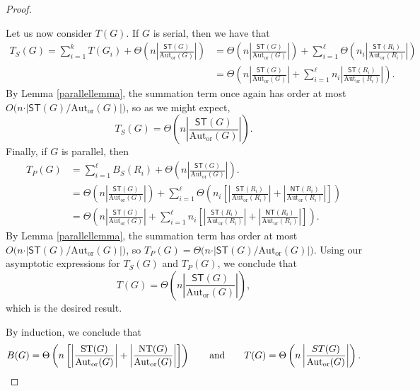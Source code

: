 \documentclass[10pt,a4paper]{amsart}
\begin{document}
\begin{proof}
\begin{enumerate}
        Let us now consider $T(G)$. If $G$ is serial, then we have that
        \begin{align*}
            T_S(G) = \sum_{i = 1}^k T(G_i) + \Theta\left(n\left\vert \frac{\textsf{ST}(G)}{\text{Aut}_\text{or}(G)}\right\vert\right)  &= \Theta\left(n\left\vert \frac{\textsf{ST}(G)}{\text{Aut}_\text{or}(G)}\right\vert\right) + \sum_{i = 1}^\ell \Theta\left(n_i\left\vert \frac{\textsf{ST}(R_i)}{\text{Aut}_\text{or}(R_i)}\right\vert\right)\\[6pt]
             &= \Theta\left(n\left\vert \frac{\textsf{ST}(G)}{\text{Aut}_\text{or}(G)}\right\vert + \sum_{i = 1}^\ell n_i\left\vert \frac{\textsf{ST}(R_i)}{\text{Aut}_\text{or}(R_i)}\right\vert\right).
        \end{align*}
        By Lemma \ref{parallellemma}, the summation term once again has order at most $O\big(n\cdot\vert\textsf{ST}(G)/\text{Aut}_\text{or}(G)\vert\big)$, so as we might expect,
        \[T_S(G) = \Theta\left(n\left\vert \frac{\textsf{ST}(G)}{\text{Aut}_\text{or}(G)}\right\vert\right).\]
        Finally, if $G$ is parallel,
        then
         \begin{align*}
            T_P(G) &= \sum_{i = 1}^\ell B_S(R_i) + \Theta\left(n\left\vert \frac{\textsf{ST}(G)}{\text{Aut}_\text{or}(G)}\right\vert\right).\\[6pt]
             &= \Theta\left(n\left\vert \frac{\textsf{ST}(G)}{\text{Aut}_\text{or}(G)}\right\vert\right) + \sum_{i = 1}^\ell \Theta\left(n_i\left[\left\vert \frac{\textsf{ST}(R_i)}{\text{Aut}_\text{or} (R_i)}\right\vert + \left\vert \frac{\textsf{NT}(R_i)}{\text{Aut}_\text{or} (R_i)}\right\vert\right]\right)\\[6pt]
             &= \Theta\left(n\left\vert \frac{\textsf{ST}(G)}{\text{Aut}_\text{or}(G)}\right\vert + \sum_{i = 1}^\ell n_i\left[\left\vert \frac{\textsf{ST}(R_i)}{\text{Aut}_\text{or} (R_i)}\right\vert + \left\vert \frac{\textsf{NT}(R_i)}{\text{Aut}_\text{or} (R_i)}\right\vert\right]\right).
        \end{align*}
        By Lemma \ref{parallellemma}, the summation term has order at most $O\big(n\cdot \vert \textsf{ST}(G)/\text{Aut}_\text{or}(G)\vert\big)$, so $T_P(G) = \Theta\big(n\cdot \vert \textsf{ST}(G)/\text{Aut}_\text{or}(G)\vert\big)$. Using our asymptotic expressions for $T_S(G)$ and $T_P(G)$, we conclude that
        \[T(G) = \Theta\left(n\left\vert \frac{\textsf{ST}(G)}{\text{Aut}_\text{or}(G)}\right\vert\right),\]
        which is the desired result.
    \end{enumerate}
    By induction, we conclude that \[B(G) = \Theta\left(n\left[\left\vert \frac{\text{\textsf{ST}}(G)}{\text{Aut}_\text{or}(G)}\right\vert + \left\vert \frac{\text{\textsf{NT}}(G)}{\text{Aut}_\text{or}(G)}\right\vert\right]\right) \qquad\text{and}\qquad T(G) = \Theta\left(n\left\vert \frac{\textsf{ST}(G)}{\text{Aut}_\text{or}(G)}\right\vert\right).\]
\end{proof}
\end{document}
